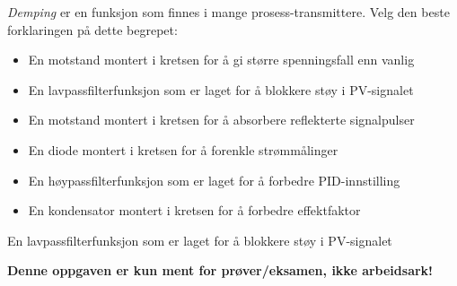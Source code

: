 

{\it Demping} er en funksjon som finnes i mange prosess-transmittere. Velg den beste forklaringen på dette begrepet:

\vskip 10pt

\begin{itemize}
\item{} En motstand montert i kretsen for å gi større spenningsfall enn vanlig
\vskip 10pt
\item{} En lavpassfilterfunksjon som er laget for å blokkere støy i PV-signalet
\vskip 10pt
\item{} En motstand montert i kretsen for å absorbere reflekterte signalpulser
\vskip 10pt
\item{} En diode montert i kretsen for å forenkle strømmålinger
\vskip 10pt
\item{} En høypassfilterfunksjon som er laget for å forbedre PID-innstilling
\vskip 10pt
\item{} En kondensator montert i kretsen for å forbedre effektfaktor
\end{itemize}







En lavpassfilterfunksjon som er laget for å blokkere støy i PV-signalet







{\bf Denne oppgaven er kun ment for prøver/eksamen, ikke arbeidsark!}



